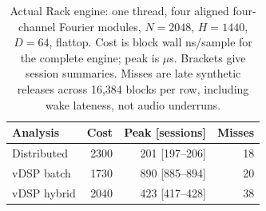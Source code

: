 \begin{table}[htbp]
\centering\small
\begin{tabular}{@{}lrrr@{}}
\toprule
Analysis & Cost & Peak [sessions] & Misses \\
\midrule
Distributed & 2300 & 201 [197--206] & 18 \\
vDSP batch & 1730 & 890 [885--894] & 20 \\
vDSP hybrid & 2040 & 423 [417--428] & 38 \\
\bottomrule
\end{tabular}
\caption{Actual Rack engine: one thread, four aligned four-channel Fourier modules, $N=2048$, $H=1440$, $D=64$, flattop. Cost is block wall ns/sample for the complete engine; peak is $\mu$s. Brackets give session summaries. Misses are late synthetic releases across 16,384 blocks per row, including wake lateness, not audio underruns.}
\label{tab:conference-host}
\end{table}

